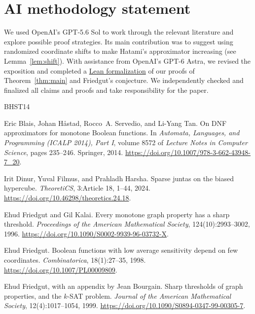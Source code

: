 \documentclass[11pt,letterpaper]{article}
\theoremstyle{definition}
\theoremstyle{remark}
\begin{document}
\section*{AI methodology statement}
We used OpenAI's GPT-5.6 Sol to work through the relevant literature and
explore possible proof strategies.  Its main contribution was to suggest
using randomized coordinate shifts to make Hatami's approximator increasing
(see Lemma~\ref{lem:shift}).  With assistance from OpenAI's GPT-6 Astra,
we revised the exposition and completed a
\href{https://github.com/liuchliuch/narrow-dnf-lean}{Lean formalization}
of our proofs of Theorem~\ref{thm:main} and Friedgut's conjecture.
We independently checked and finalized all claims and proofs and take
responsibility for the paper.

\begin{thebibliography}{BHST14}

Eric Blais, Johan H\aa stad, Rocco~A. Servedio, and Li-Yang Tan.
\newblock On DNF approximators for monotone Boolean functions.
\newblock In \emph{Automata, Languages, and Programming (ICALP 2014), Part I},
  volume 8572 of \emph{Lecture Notes in Computer Science}, pages 235--246.
  Springer, 2014.
\newblock \url{https://doi.org/10.1007/978-3-662-43948-7_20}.

Irit Dinur, Yuval Filmus, and Prahladh Harsha.
\newblock Sparse juntas on the biased hypercube.
\newblock \emph{TheoretiCS}, 3:Article 18, 1--44, 2024.
\newblock \url{https://doi.org/10.46298/theoretics.24.18}.

Ehud Friedgut and Gil Kalai.
\newblock Every monotone graph property has a sharp threshold.
\newblock \emph{Proceedings of the American Mathematical Society},
  124(10):2993--3002, 1996.
\newblock \url{https://doi.org/10.1090/S0002-9939-96-03732-X}.

Ehud Friedgut.
\newblock Boolean functions with low average sensitivity depend on few
  coordinates.
\newblock \emph{Combinatorica}, 18(1):27--35, 1998.
\newblock \url{https://doi.org/10.1007/PL00009809}.

Ehud Friedgut, with an appendix by Jean Bourgain.
\newblock Sharp thresholds of graph properties, and the $k$-SAT problem.
\newblock \emph{Journal of the American Mathematical Society},
  12(4):1017--1054, 1999.
\newblock \url{https://doi.org/10.1090/S0894-0347-99-00305-7}.


\end{thebibliography}
\end{document}
